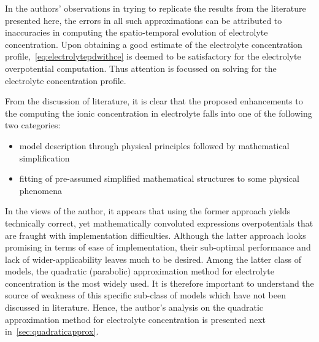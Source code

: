 In  the  authors'   observations  in  trying  to  replicate   the  results  from
the  literature  presented here,  the  errors  in  all such  approximations  can
be  attributed  to  inaccuracies  in  computing  the  spatio-temporal  evolution
of  electrolyte   concentration.  Upon   obtaining  a   good  estimate   of  the
electrolyte concentration profile,~\cref{eq:electrolytepdwithce} is deemed to be
satisfactory for  the electrolyte  overpotential computation. Thus  attention is
focussed on solving for the electrolyte concentration profile.

From the discussion of literature, it is clear that the proposed enhancements to
the  computing the  ionic concentration  in electrolyte  falls into  one of  the
following two categories:
\begin{itemize}
    \item model description through physical principles followed by mathematical
        simplification
    \item fitting of pre-assumed simplified mathematical structures to some
        physical phenomena
\end{itemize}

In the  views of the  author, it appears that  using the former  approach yields
technically  correct, yet  mathematically convoluted  expressions overpotentials
that are fraught with implementation  difficulties. Although the latter approach
looks  promising  in   terms  of  ease  of   implementation,  their  sub-optimal
performance and lack of wider-applicability leaves much to be desired. Among the
latter  class of  models,  the quadratic  (parabolic)  approximation method  for
electrolyte concentration  is the most widely  used. It
is therefore  important to understand  the source  of weakness of  this specific
sub-class  of  models  which  have  not been  discussed  in  literature.  Hence,
the  author's analysis  on the  quadratic approximation  method for  electrolyte
concentration is presented next in~\cref{sec:quadraticapprox}.




